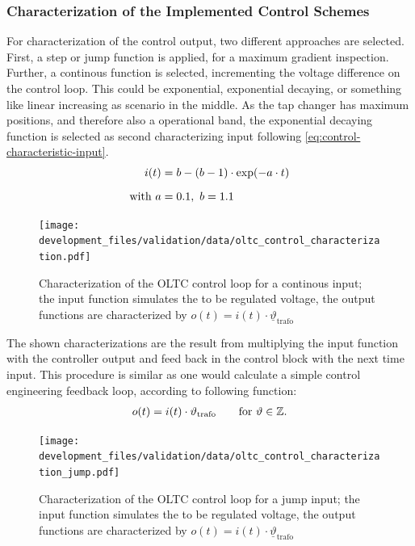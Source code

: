 \subsubsection{Characterization of the Implemented Control Schemes}

For characterization of the control output, two different approaches are selected.
First, a step or jump function is applied, for a maximum gradient inspection.
Further, a continous function is selected, incrementing the voltage difference on the control loop.
This could be exponential, exponential decaying, or something like linear increasing as scenario in the middle.
As the tap changer has maximum positions, and therefore also a operational band, the exponential decaying function is selected as second characterizing input following \autoref{eq:control-characteristic-input}.
\begin{align}
        i(t) &=b - (b-1) \cdot \exp(-a \cdot t) \label{eq:control-characteristic-input} \\[6pt]
        \text{with } a&=0.1,~b=1.1 \notag
\end{align}

\begin{figure}[htbp!]
        \centering
        \texttt{[image: development\_files/validation/data/oltc\_control\_characterization.pdf]}
        \caption[Characterization of the OLTC control loops for a continous input]{Characterization of the OLTC control loop for a continous input; the input function simulates the to be regulated voltage, the output functions are characterized by $o(t)=i(t) \cdot \underline{\vartheta}_\mathrm{trafo}$}
        \label{fig:oltc-control-characterization}
\end{figure}

The shown characterizations are the result from multiplying the input function with the controller output and feed back in the control block with the next time input.
This procedure is similar as one would calculate a simple control engineering feedback loop, according to following function:
\begin{align}
        o(t)=i(t) \cdot \vartheta_\mathrm{trafo} \quad\quad \text{for }\vartheta \in \mathbb{Z}. \notag
\end{align}

\begin{figure}[htbp!]
        \centering
        \texttt{[image: development\_files/validation/data/oltc\_control\_characterization\_jump.pdf]}
        \caption[Characterization of the OLTC control loops for a jump input]{Characterization of the OLTC control loop for a jump input; the input function simulates the to be regulated voltage, the output functions are characterized by $o(t)=i(t) \cdot \underline{\vartheta}_\mathrm{trafo}$}
        \label{fig:oltc-control-characterization-jump}
\end{figure}


